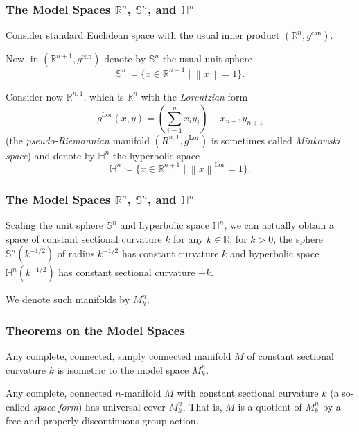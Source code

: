 \documentclass[handout]{beamer}
\DeclareMathOperator{\can}{can}
\DeclareMathOperator{\Lor}{Lor}
\newcommand{\Sp}{\mathbb{S}}
\newcommand{\Hy}{\mathbb{H}}
\newcommand{\R}{\mathbb{R}}
\newcommand{\norm}[1]{\left\lVert#1\right\rVert}
\theoremstyle{definition}
\begin{document}
\begin{frame}
    \frametitle{The Model Spaces $\R^n$, $\Sp^n$, and $\Hy^n$}

    Consider standard Euclidean space with the usual inner product $(\R^n, g^{\can})$.

    \pause
    Now, in $(\R^{n+1}, g^{\can})$ denote by $\Sp^n$ the usual unit sphere
    \[
      \Sp^n \coloneqq \{x \in \R^{n+1} \mid \norm{x} = 1\}.
    \]

    \pause
    Consider now $\R^{n,1}$, which is $\R^n$ with the \emph{Lorentzian} form
    \[
        g^{\Lor}(x,y) = \left(\sum_{i=1}^n x_i y_i\right) - x_{n+1}y_{n+1}
    \]
    (the \emph{pseudo-Riemannian} manifold $(R^{n,1},g^{\Lor})$ is sometimes
    called \emph{Minkowski space})
    and denote by $\Hy^n$ the hyperbolic space
    \[
      \Hy^n \coloneqq \{x \in \R^{n+1} \mid \norm{x}^{\Lor} = 1\}.
    \]
\end{frame}

\begin{frame}
    \frametitle{The Model Spaces $\R^n$, $\Sp^n$, and $\Hy^n$}

    \pause
    Scaling the unit sphere $\Sp^n$ and hyperbolic space $\Hy^n$, we can
    actually obtain a space of constant sectional curvature $k$ for any
    $k \in \R$; for $k > 0$, the sphere $\Sp^n(k^{-1/2})$ of radius
    $k^{-1/2}$ has constant curvature $k$ and hyperbolic space
    $\Hy^n(k^{-1/2})$ has constant sectional curvature $-k$.

    \pause
    We denote such manifolds by $M_k^n$.

\end{frame}

\begin{frame}
    \frametitle{Theorems on the Model Spaces}

    \pause
    \begin{theorem}
        Any complete, connected, simply connected manifold $M$ of constant sectional
        curvature $k$ is isometric to the model space $M_k^n$.
    \end{theorem}

    \pause
    \begin{theorem}
        Any complete, connected $n$-manifold $M$ with constant sectional curvature $k$
        (a so-called \emph{space form}) has universal cover $M_k^n$.
        That is, $M$ is a quotient of $M_k^n$ by a free and properly discontinuous
        group action.
    \end{theorem}
\end{frame}
\end{document}
